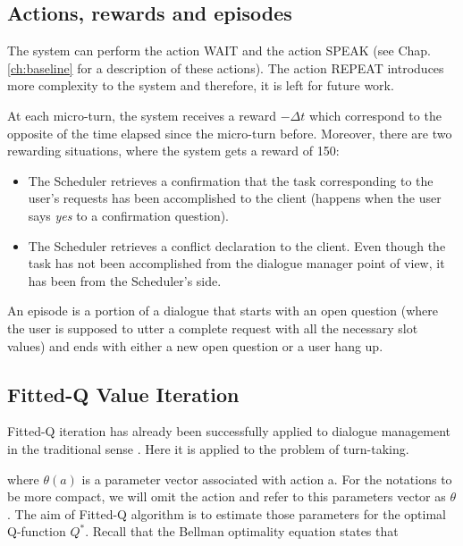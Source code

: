    	\subsection{Actions, rewards and episodes}
    
    	The system can perform the action WAIT and the action SPEAK (see Chap. \ref{ch:baseline} for a description of these actions). The action REPEAT introduces more complexity to the system and therefore, it is left for future work.
        
    	At each micro-turn, the system receives a reward $-\Delta t$ which correspond to the opposite of the time elapsed since the micro-turn before. Moreover, there are two rewarding situations, where the system gets a reward of 150:
        
        \begin{itemize}
        	\item The Scheduler retrieves a confirmation that the task corresponding to the user's requests has been accomplished to the client (happens when the user says \textit{yes} to a confirmation question).
            \item The Scheduler retrieves a conflict declaration to the client. Even though the task has not been accomplished from the dialogue manager point of view, it has been from the Scheduler's side.
        \end{itemize}
        
        An episode is a portion of a dialogue that starts with an open question (where the user is supposed to utter a complete request with all the necessary slot values) and ends with either a new open question or a user hang up.
            
	\subsection{Fitted-Q Value Iteration}
    
    	Fitted-Q iteration has already been successfully applied to dialogue management in the traditional sense \cite{Chandramohan2010}. Here it is applied to the problem of turn-taking. 
            
      	where $\theta(a)$ is a parameter vector associated with action a. For the notations to be more compact, we will omit the action and refer to this parameters vector as $\theta$. The aim of Fitted-Q algorithm is to estimate those parameters for the optimal Q-function $Q^*$. Recall that the Bellman optimality equation states that
        
